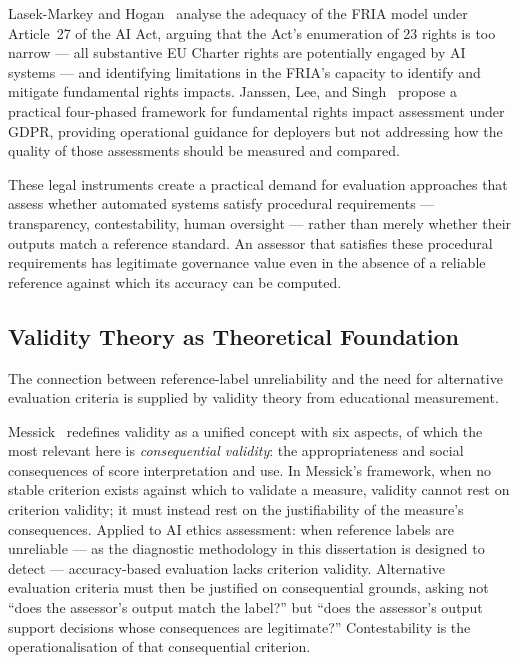 Lasek-Markey and Hogan~\cite{lasekmarkey2025} analyse the adequacy of the
FRIA model under Article~27 of the AI Act, arguing that the Act's enumeration
of 23 rights is too narrow --- all substantive EU Charter rights are
potentially engaged by AI systems --- and identifying limitations in the
FRIA's capacity to identify and mitigate fundamental rights impacts.  Janssen,
Lee, and Singh~\cite{janssen2022} propose a practical four-phased framework
for fundamental rights impact assessment under GDPR, providing operational
guidance for deployers but not addressing how the quality of those assessments
should be measured and compared.

These legal instruments create a practical demand for evaluation approaches
that assess whether automated systems satisfy procedural requirements ---
transparency, contestability, human oversight --- rather than merely whether
their outputs match a reference standard.  An assessor that satisfies these
procedural requirements has legitimate governance value even in the absence of
a reliable reference against which its accuracy can be computed.

\subsection{Validity Theory as Theoretical Foundation}

The connection between reference-label unreliability and the need for
alternative evaluation criteria is supplied by validity theory from educational
measurement.

Messick~\cite{messick1995} redefines validity as a unified concept with six
aspects, of which the most relevant here is \emph{consequential validity}: the
appropriateness and social consequences of score interpretation and use.  In
Messick's framework, when no stable criterion exists against which to validate
a measure, validity cannot rest on criterion validity; it must instead rest on
the justifiability of the measure's consequences.  Applied to AI ethics
assessment: when reference labels are unreliable --- as the diagnostic
methodology in this dissertation is designed to detect --- accuracy-based
evaluation lacks criterion validity.  Alternative evaluation criteria must
then be justified on consequential grounds, asking not ``does the assessor's
output match the label?'' but ``does the assessor's output support decisions
whose consequences are legitimate?''  Contestability is the operationalisation
of that consequential criterion.

